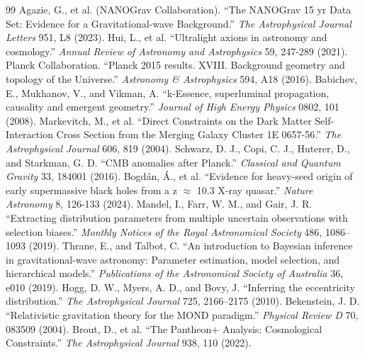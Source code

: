 \documentclass[aps,prd,10pt,twocolumn,superscriptaddress,nofootinbib]{revtex4-2}
\begin{document}
\begin{thebibliography}{99}
 Agazie, G., et al. (NANOGrav Collaboration). ``The NANOGrav 15 yr Data Set: Evidence for a Gravitational-wave Background.'' \textit{The Astrophysical Journal Letters} 951, L8 (2023).
 Hui, L., et al. ``Ultralight axions in astronomy and cosmology.'' \textit{Annual Review of Astronomy and Astrophysics} 59, 247-289 (2021).
 Planck Collaboration. ``Planck 2015 results. XVIII. Background geometry and topology of the Universe.'' \textit{Astronomy \& Astrophysics} 594, A18 (2016).
 Babichev, E., Mukhanov, V., and Vikman, A. ``k-Essence, superluminal propagation, causality and emergent geometry.'' \textit{Journal of High Energy Physics} 0802, 101 (2008).
 Markevitch, M., et al. ``Direct Constraints on the Dark Matter Self-Interaction Cross Section from the Merging Galaxy Cluster 1E 0657-56.'' \textit{The Astrophysical Journal} 606, 819 (2004).
 Schwarz, D. J., Copi, C. J., Huterer, D., and Starkman, G. D. ``CMB anomalies after Planck.'' \textit{Classical and Quantum Gravity} 33, 184001 (2016).
 Bogdán, Á., et al. ``Evidence for heavy-seed origin of early supermassive black holes from a z $\approx$ 10.3 X-ray quasar.'' \textit{Nature Astronomy} 8, 126-133 (2024).
 Mandel, I., Farr, W. M., and Gair, J. R. ``Extracting distribution parameters from multiple uncertain observations with selection biases.'' \textit{Monthly Notices of the Royal Astronomical Society} 486, 1086--1093 (2019).
 Thrane, E., and Talbot, C. ``An introduction to Bayesian inference in gravitational-wave astronomy: Parameter estimation, model selection, and hierarchical models.'' \textit{Publications of the Astronomical Society of Australia} 36, e010 (2019).
 Hogg, D. W., Myers, A. D., and Bovy, J. ``Inferring the eccentricity distribution.'' \textit{The Astrophysical Journal} 725, 2166--2175 (2010).
 Bekenstein, J. D. ``Relativistic gravitation theory for the MOND paradigm.'' \textit{Physical Review D} 70, 083509 (2004).
 Brout, D., et al. ``The Pantheon+ Analysis: Cosmological Constraints.'' \textit{The Astrophysical Journal} 938, 110 (2022).
\end{thebibliography}
\end{document}
